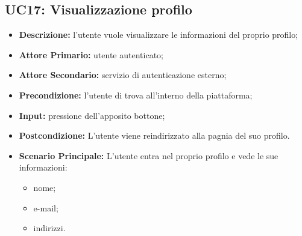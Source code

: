 \subsection{UC17: Visualizzazione profilo}
\label{sec:UC17}
\begin{itemize}
    \item \textbf{Descrizione:} l'utente vuole visualizzare le informazioni del proprio profilo;
    \item \textbf{Attore Primario:} utente autenticato;
    \item \textbf{Attore Secondario:} servizio di autenticazione esterno;
    \item \textbf{Precondizione:} l'utente di trova all'interno della piattaforma;
    \item \textbf{Input:} pressione dell'apposito bottone;
    \item \textbf{Postcondizione:} L'utente viene reindirizzato alla pagnia del suo profilo.
    \item \textbf{Scenario Principale:} L'utente entra nel proprio profilo e vede le sue informazioni:
    \begin{itemize}
        \item nome;
        \item e-mail;
        \item indirizzi.
    \end{itemize}
\end{itemize}